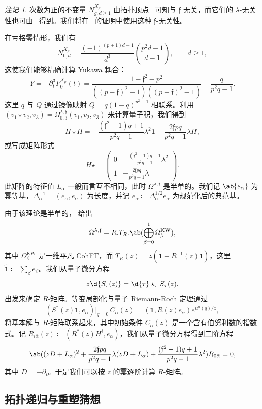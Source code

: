 \documentclass{amsart}
\theoremstyle{definition}
\theoremstyle{remark}
\newtheorem{rmk}[thm]{注记}
\theoremstyle{plain}
\theoremstyle{definition}
\theoremstyle{remark}
\newcommand{\mf}[1]{\mathfrak{#1}}
\newcommand{\mr}[1]{\mathrm{#1}}
\newcommand{\wt}[1]{\widetilde{#1}}
\newcommand{\1}{\mathbf{1}}
\newcommand{\2}{\mathbf{2}}
\newcommand{\3}{\mathbf{3}}
\begin{document}
\begin{rmk}
    次数为正的不变量 \(N^{X_p}_{g,d\geq1}\) 由拓扑顶点~\cite{LLLZ2009} 可知与 \(\mf{f}\) 无关，而它们的 \(\lambda\)-无关性也可由~ 得到。我们将在~ 的证明中使用这种 \(\mf{f}\)-无关性。
\end{rmk}

在亏格零情形，我们有
\[ N^{X_p}_{0,d} = \frac{(-1)^{(p+1)d-1}}{d^3}\binom{p^2d-1}{d-1}, \qquad d \geq 1, \]
这使我们能够精确计算 Yukawa 耦合：
\[ Y = -\partial_t^3 F_0^{X_p}(t) = \frac{1-\mf{f}^2-p^2}{((p-\mf{f})^2-1)((p+\mf{f})^2-1)} + \frac{q}{p^2q-1}. \]
这里 \(q\) 与 \(Q\) 通过镜像映射 \(Q = q(1-q)^{p^2-1}\) 相联系。利用 \((v_1 \star v_2, v_3) = \Omega^{\lambda,\mf{f}}_{0,3}(v_1,v_2,v_3)\) 来计算量子积，我们得到
\[ H \star H = -\frac{(\mf{f}^2-1)q+1}{p^2q-1}\lambda^2 \1 - \frac{2\mf{f}pq}{p^2q-1}\lambda H, \]
或写成矩阵形式
\[ H \star = \begin{pmatrix} 0 & -\frac{(\mf{f}^2-1)q+1}{p^2q-1}\lambda^2 \\ 1 & -\frac{2\mf{f}pq}{p^2q-1}\lambda \end{pmatrix}. \]
此矩阵的特征值 \(L_{\alpha}\) 一般而言互不相同，此时 \(\Omega^{\lambda,\mf{f}}\) 是半单的。我们记 \(\ab\{e_{\alpha}\}\) 为幂等基，\(\Delta_{\alpha}^{-1} = (e_{\alpha},e_{\alpha})\) 为长度，并记 \(\bar{e}_{\alpha} \coloneqq \Delta_{\alpha}^{1/2}e_{\alpha}\) 为规范化后的典范基。

由于该理论是半单的， 给出
\[ \Omega^{\lambda,\mf{f}} = R.T_R.\ab(\bigoplus_{\beta=0}^1 \Omega^{\mr{KW}}_{\beta}), \]
其中 \(\Omega^{\mr{KW}}_{\beta}\) 是一维平凡 CohFT，而 \(T_R(z) = z(\wt{\1}-R^{-1}(z)\1)\)，这里 \(\wt{\1} \coloneqq \sum_{\beta}\bar{e}_{\beta}\)。我们从量子微分方程
\[ z \d{S_{\tau}(z)} = \d{\tau} \star_{\tau} S_{\tau}(z). \]
出发来确定 \(R\)-矩阵。等变局部化与量子 Riemann-Roch 定理通过
\[ (S^*_{\tau}(z)\1, \bar{e}_{\alpha})\big|_{q=0}\, C_{\alpha}(z) = (\1, R(z)\bar{e}_{\alpha})e^{u^{\alpha}(q)/z}, \]
将基本解与 \(R\)-矩阵联系起来，其中初始条件 \(C_{\alpha}(z)\) 是一个含有伯努利数的指数式。记 \(R_{i\bar{\alpha}}(z) \coloneqq (R^*(z)H^i, \bar{e}_{\alpha})\)，我们从量子微分方程得到二阶方程
\[ \ab( (zD+L_{\alpha})^2 + \frac{2\mf{f}pq}{p^2q-1}\lambda(zD+L_{\alpha}) + \frac{(\mf{f}^2-1)q+1}{p^2q-1}\lambda^2 )R_{0\bar{\alpha}} = 0, \]
其中 \(D = -\partial_t\)。于是我们可以按 \(z\) 的幂逐阶计算 \(R\)-矩阵。

\subsection{拓扑递归与重塑猜想}%
\label{sub:Topological recursion and the remodeling conjecture}
\end{document}
